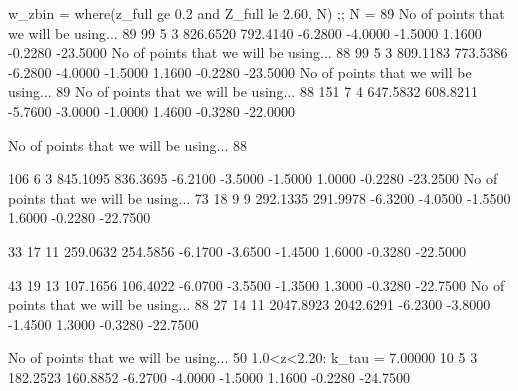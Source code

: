 w_zbin = where(z_full ge 0.2 and Z_full le 2.60, N)    ;; N = 89
     No of points that we will be using...          89
      99       5       3       826.6520       792.4140  -6.2800  -4.0000  -1.5000   1.1600  -0.2280 -23.5000
     No of points that we will be using...          88
      99       5       3       809.1183       773.5386  -6.2800  -4.0000  -1.5000   1.1600  -0.2280 -23.5000
     No of points that we will be using...          89
     No of points that we will be using...          88
     151       7       4       647.5832       608.8211  -5.7600  -3.0000  -1.0000   1.4600  -0.3280 -22.0000




No of points that we will be using...          88

     106       6       3       845.1095       836.3695  -6.2100  -3.5000  -1.5000   1.0000  -0.2280 -23.2500
No of points that we will be using...          73
          18       9       9       292.1335       291.9978  -6.3200  -4.0500  -1.5500   1.6000  -0.2280 -22.7500

      33      17      11       259.0632       254.5856  -6.1700  -3.6500  -1.4500   1.6000  -0.3280 -22.5000

      43      19      13       107.1656       106.4022  -6.0700  -3.5500  -1.3500   1.3000  -0.3280 -22.7500
No of points that we will be using...          88
      27      14      11      2047.8923      2042.6291  -6.2300  -3.8000  -1.4500   1.3000  -0.3280 -22.7500




No of points that we will be using...          50
   1.0<z<2.20:
k_tau = 7.00000
      10       5       3       182.2523       160.8852  -6.2700  -4.0000  -1.5000   1.1600  -0.2280 -24.7500



